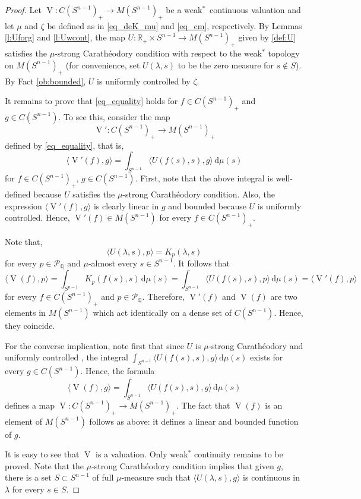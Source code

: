 \documentclass[11pt, a4paper]{amsart}
\renewcommand{\d}{\,\mathrm{d}}
\newcommand{\cm}{\zeta}
\newcommand{\rp}{\mathbb R_{\scriptscriptstyle +}}
\newcommand{\sn}{{S^{n-1}}}
\renewcommand{\d}{\,\mathrm{d}}
\newcommand{\oV}{\operatorname{V}}
\newcommand{\measn}{M(\sn )_{\scriptscriptstyle +}}
\newcommand{\cfn}{C(\sn )_{\scriptscriptstyle +}}
\newcommand{\poly}{\mathcal P_{\mathbb Q}}
\newcommand{\somename}{strong Cara\-th\'eo\-dory and uniformly controlled }
\begin{document}
\begin{proof}
Let $\oV\colon \cfn\to \measn$ be a weak$^*$~continuous valuation and let $\mu$ and $\cm$ be defined as in \eqref{eq_deK_mu} and \eqref{eq_cm}, respectively. By Lemmas \ref{l:Uforg} and \ref{l:Uwcont}, the map $U\colon \rp \times \sn  \to \measn$ given by \eqref{def:U} satisfies the $\mu$-strong Carath\'eodory condition with respect to the weak$^*$ topology on $\measn$ (for convenience, set $U(\lambda,s)$ to be the zero measure for $s\notin S$). By Fact \ref{ob:bounded}, $U$ is uniformly controlled by $\cm$.

It remains to prove that \eqref{eq_equality} holds for $f\in\cfn$ and $g\in C(\sn)$. To see this, consider the map $$\oV'\colon\cfn\to \measn$$ defined by 
\eqref{eq_equality}, that is, $$\langle \oV'(f),g\rangle = \int_{\sn } \langle U(f(s), s),g\rangle \d\mu(s)$$
for $f\in\cfn$, $g\in C(\sn)$. First, note that the above integral is well-defined because $U$ satisfies the $\mu$-strong Carath\'eodory condition. Also, the expression $\langle \oV'(f),g\rangle$ is clearly linear in $g$ and bounded because $U$ is uniformly controlled. Hence, $\oV'(f)\in M(\sn )$ for every $f\in\cfn$. 

Note that, $$\langle U(\lambda, s),p\rangle = K_{p}(\lambda, s)$$ for every $p\in \poly$ and  $\mu$-almost every $s\in \sn $. It follows that 
$$\langle \oV(f),p\rangle= \int_{\sn } \!K_p(f(s), s) \d\mu(s) = \int_{\sn }\! \langle U(f(s), s),p\rangle \d\mu(s) = \langle \oV'(f),p\rangle$$
for every $f\in \cfn$ and $p\in \poly$.
Therefore, $\oV'(f)$ and $\oV(f)$ are two elements in $M(\sn )$ which act identically on a dense set of $C(\sn )$. Hence, they coincide.  

For the converse implication, note first that since $U$ is $\mu$-\somename, the integral $\int_{\sn } \langle U(f(s), s),g\rangle \d\mu(s)$ exists for every $g\in C(\sn)$.  Hence, the formula $$
\langle \oV(f),g\rangle = \int_{\sn } \langle U(f(s), s),g\rangle \d\mu(s)$$
defines a map $\oV\colon \cfn\to \measn$. The fact that $\oV(f)$ is an element of $M(\sn )$ follows as above: it defines a linear and bounded function of $g$. 

It is easy to see that $\oV$ is a valuation. Only weak$^*$ continuity remains to be proved. 
Note that the $\mu$-strong Carath\'eodory condition implies that given $g$, there is a set $S\subset \sn $  of full $\mu$-measure such that $\langle U(\lambda, s),g\rangle$ is continuous in $\lambda$ for every $s\in S$.  


\end{proof}
\end{document}
